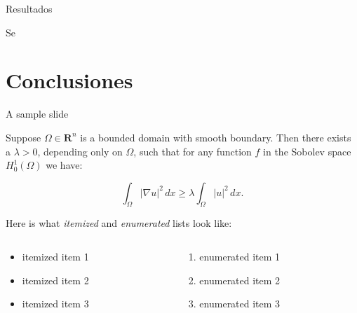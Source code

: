 \documentclass{beamer}
\begin{document}
\begin{frame}{Resultados}
\par Se
\end{frame}

\section{Conclusiones}
\begin{frame}{A sample slide}

\begin{theorem}
Suppose $\Omega\in\mathbf{R}^n$ is a bounded domain with smooth
boundary.  Then there exists a $\lambda>0$, depending only on
$\Omega$, such that for any function $f$ in the Sobolev space
$H^1_0(\Omega)$ we have:

\[
  \int_\Omega |\nabla u|^2 \,dx \ge 
  \lambda \int_\Omega |u|^2 \,dx .
\]
\end{theorem}

Here is what \emph{itemized} and \emph{enumerated} lists look like:

\begin{columns}
  \begin{column}{0.45\textwidth}
  \begin{itemize}
    \item itemized item 1
    \item itemized item 2
    \item itemized item 3
  \end{itemize}
  \end{column}

  \begin{column}{0.45\textwidth}
  \begin{enumerate}
    \item enumerated item 1
    \item enumerated item 2
    \item enumerated item 3
  \end{enumerate}
  \end{column}
\end{columns}

\end{frame}
\end{document}
